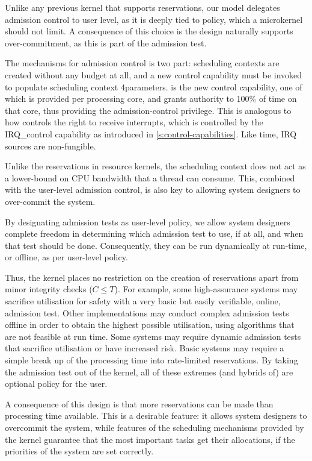 Unlike any previous kernel that supports reservations, our model delegates admission control to user
level, as it is deeply tied to policy, which a microkernel should not limit. A consequence of this
choice is the design naturally supports over-commitment, as this is part of the admission test.

The mechanisms for admission control is two part: scheduling contexts are created without
any budget at all, and a new control capability must be invoked to populate scheduling context
4parameters.
 is the new control capability, one of which is provided per processing core,
and grants authority to 100\% of time on that core, thus providing the admission-control privilege.
This is analogous to how \selfour controls the right
to receive interrupts, which is controlled by the IRQ\_control
capability as introduced in \cref{s:control-capabilities}. Like time, IRQ sources are non-fungible.

Unlike the reservations in resource kernels, the scheduling context does not 
act as a lower-bound on CPU bandwidth that a thread can consume. This, combined with the
user-level admission control, is also key to allowing system designers to over-commit the system. 

By designating admission tests as user-level policy, we allow system designers complete freedom
in determining which admission test to use, if at all, and when that test should be done.
Consequently, they can be run dynamically at run-time, or offline, as per user-level policy.

Thus, the kernel places no restriction on the creation of reservations apart from minor integrity
checks (\ie $C \leq T$).
For example, some high-assurance systems may sacrifice utilisation for safety with a very basic but easily verifiable, online, admission test.
Other implementations may conduct complex admission tests offline in order to obtain the highest possible utilisation, using algorithms that are not feasible at run time.
Some systems may require dynamic admission tests that sacrifice utilisation or have increased risk.
Basic systems may require a simple break up of the processing time into rate-limited reservations.
By taking the admission test out of the kernel, all of these extremes (and hybrids of) are optional policy for the user.

A consequence of this design is that more reservations can be made than processing time available.
This is a desirable feature: it allows system designers to overcommit the system, while features of the scheduling mechanisms provided by the kernel guarantee that the most important tasks get their allocations, if the priorities of the system are set correctly.


